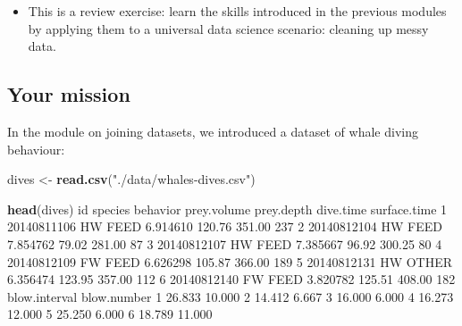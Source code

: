 \documentclass[
]{book}
\newenvironment{Shaded}{\begin{snugshade}}{\end{snugshade}}
\newcommand{\DecValTok}[1]{\textcolor[rgb]{0.00,0.00,0.81}{#1}}
\newcommand{\FloatTok}[1]{\textcolor[rgb]{0.00,0.00,0.81}{#1}}
\newcommand{\KeywordTok}[1]{\textcolor[rgb]{0.13,0.29,0.53}{\textbf{#1}}}
\newcommand{\NormalTok}[1]{#1}
\newcommand{\StringTok}[1]{\textcolor[rgb]{0.31,0.60,0.02}{#1}}
\providecommand{\tightlist}{%
  \setlength{\itemsep}{0pt}\setlength{\parskip}{0pt}}
\begin{document}
\begin{itemize}
\tightlist
\item
  This is a review exercise: learn the skills introduced in the previous modules by applying them to a universal data science scenario: cleaning up messy data.
\end{itemize}

\hypertarget{your-mission}{%
\subsection*{Your mission}\label{your-mission}}

In the module on joining datasets, we introduced a dataset of whale diving behaviour:

\begin{Shaded}
\begin{Highlighting}[]
\NormalTok{dives <-}\StringTok{ }\KeywordTok{read.csv}\NormalTok{(}\StringTok{"./data/whales-dives.csv"}\NormalTok{)}
\end{Highlighting}
\end{Shaded}

\begin{Shaded}
\begin{Highlighting}[]
\KeywordTok{head}\NormalTok{(dives)}
\NormalTok{           id species behavior prey.volume prey.depth dive.time surface.time}
\DecValTok{1} \DecValTok{20140811106}\NormalTok{      HW     FEED    }\FloatTok{6.914610}     \FloatTok{120.76}    \FloatTok{351.00}          \DecValTok{237}
\DecValTok{2} \DecValTok{20140812104}\NormalTok{      HW     FEED    }\FloatTok{7.854762}      \FloatTok{79.02}    \FloatTok{281.00}           \DecValTok{87}
\DecValTok{3} \DecValTok{20140812107}\NormalTok{      HW     FEED    }\FloatTok{7.385667}      \FloatTok{96.92}    \FloatTok{300.25}           \DecValTok{80}
\DecValTok{4} \DecValTok{20140812109}\NormalTok{      FW     FEED    }\FloatTok{6.626298}     \FloatTok{105.87}    \FloatTok{366.00}          \DecValTok{189}
\DecValTok{5} \DecValTok{20140812131}\NormalTok{      HW    OTHER    }\FloatTok{6.356474}     \FloatTok{123.95}    \FloatTok{357.00}          \DecValTok{112}
\DecValTok{6} \DecValTok{20140812140}\NormalTok{      FW     FEED    }\FloatTok{3.820782}     \FloatTok{125.51}    \FloatTok{408.00}          \DecValTok{182}
\NormalTok{  blow.interval blow.number}
\DecValTok{1}        \FloatTok{26.833}      \FloatTok{10.000}
\DecValTok{2}        \FloatTok{14.412}       \FloatTok{6.667}
\DecValTok{3}        \FloatTok{16.000}       \FloatTok{6.000}
\DecValTok{4}        \FloatTok{16.273}      \FloatTok{12.000}
\DecValTok{5}        \FloatTok{25.250}       \FloatTok{6.000}
\DecValTok{6}        \FloatTok{18.789}      \FloatTok{11.000}
\end{Highlighting}
\end{Shaded}
\end{document}
